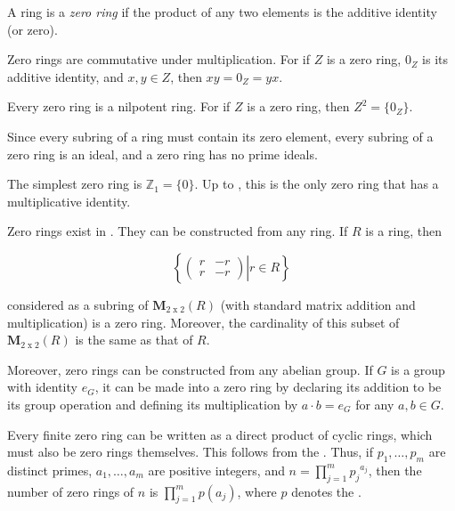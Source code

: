 \documentclass[12pt]{article}
\begin{document}
A ring is a {\sl zero ring\/} if the product of any two elements is the additive identity (or zero).

Zero rings are commutative under multiplication.  For if $Z$ is a zero ring, 
$0_Z$ is its additive identity, and $x,y \in Z$, then $xy=0_Z=yx.$

Every zero ring is a nilpotent ring.  For if $Z$ is a zero ring, then $Z^2=\{0_Z\}$.

Since every subring of a ring must contain its zero element, every subring of a zero ring is an ideal, and a zero ring has no prime ideals.

The simplest zero ring is ${\mathbb Z}_1=\{0\}$.  Up to , this is the only zero ring that has a multiplicative identity.

Zero rings exist in .  They can be constructed from any ring.  If $R$ is a ring, then

$$\left\{ \left. \left( \begin{array}{cc}
r & -r \\
r & -r \end{array} \right) \right| r \in R \right\}$$

considered as a subring of ${\mathbf M}_{2\operatorname{x}2}(R)$ (with standard matrix addition and multiplication) is a zero ring.  Moreover, the cardinality of this subset of ${\mathbf M}_{2\operatorname{x}2}(R)$ is the same as that of $R$.

Moreover, zero rings can be constructed from any abelian group.  If $G$ is a group with identity $e_G$, it can be made into a zero ring by declaring its addition to be its group operation and defining its multiplication by $a \cdot b=e_G$ for any $a,b \in G$.

Every finite zero ring can be written as a direct product of cyclic rings, which must also be zero rings themselves.  This follows from the .  Thus, if $p_1, \ldots , p_m$ are distinct primes, $a_1, \ldots , a_m$ are positive integers, and $\displaystyle n= \prod_{j=1}^m {p_j}^{a_j}$, then the number of zero rings of  $n$ is $\displaystyle \prod_{j=1}^m p(a_j)$, where $p$ denotes the .
\end{document}
